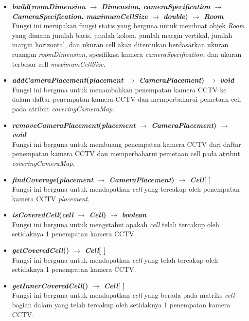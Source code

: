 \begin{itemize}
	\item \textbf{\textit{build}(\textit{roomDimension} \(\rightarrow\) \textit{Dimension}, \textit{cameraSpecification} \(\rightarrow\) \textit{CameraSpecification}, \textit{maximumCellSize} \(\rightarrow\) \textit{double}) \(\rightarrow\) \textit{Room}}\\
	Fungsi ini merupakan fungsi statis yang berguna untuk membuat objek \textit{Room} yang dimana jumlah baris, jumlah kolom, jumlah margin vertikal, jumlah margin horizontal, dan ukuran cell akan ditentukan berdasarkan ukuran ruangan \textit{roomDimension}, spesifikasi kamera \textit{cameraSpecification}, dan ukuran terbesar cell \textit{maximumCellSize}.
	\item \textbf{\textit{addCameraPlacement}(\textit{placement} \(\rightarrow\) \textit{CameraPlacement}) \(\rightarrow\) \textit{void}}\\
	Fungsi ini berguna untuk menambahkan penempatan kamera CCTV ke dalam daftar penempatan kamera CCTV dan memperbaharui pemetaan cell pada atribut \textit{coveringCameraMap}.
	\item \textbf{\textit{removeCameraPlacement}(\textit{placement} \(\rightarrow\) \textit{CameraPlacement}) \(\rightarrow\) \textit{void}}\\
	Fungsi ini berguna untuk membuang penempatan kamera CCTV dari daftar penempatan kamera CCTV dan memperbaharui pemetaan cell pada atribut \textit{coveringCameraMap}.
	\item \textbf{\textit{findCoverage}(\textit{placement} \(\rightarrow\) \textit{CameraPlacement}) \(\rightarrow\) \textit{Cell}[ ]}\\
	Fungsi ini berguna untuk mendapatkan \textit{cell} yang tercakup oleh penempatan kamera CCTV \textit{placement}.
	\item \textbf{\textit{isCoveredCell}(\textit{cell} \(\rightarrow\) \textit{Cell}) \(\rightarrow\) \textit{boolean}}\\
	Fungsi ini berguna untuk mengetahui apakah \textit{cell} telah tercakup oleh setidaknya 1 penempatan kamera CCTV.
	\item \textbf{\textit{getCoveredCell}() \(\rightarrow\) \textit{Cell}[ ]}\\
	Fungsi ini berguna untuk mendapatkan \textit{cell} yang telah tercakup oleh setidaknya 1 penempatan kamera CCTV.
	\item \textbf{\textit{getInnerCoveredCell}() \(\rightarrow\) \textit{Cell}[ ]}\\
	Fungsi ini berguna untuk mendapatkan \textit{cell} yang berada pada matriks \textit{cell} bagian dalam yang telah tercakup oleh setidaknya 1 penempatan kamera CCTV.

\end{itemize}

